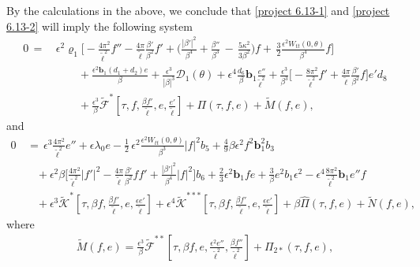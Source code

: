 \documentclass[10pt, reqno]{amsart}
\numberwithin{equation}{section}
\theoremstyle{definition}
\begin{document}
{By the calculations in the above, we conclude that \eqref{project 6.13-1} and \eqref{project 6.13-2} will imply the following system
\begin{align*}
0\,=\,&
 \epsilon^2\varrho_1\Bigg[- \frac{4\pi^2}{{\tilde\ell}^2}{f}'' - \frac{4\pi}{\tilde\ell} \frac{\beta'}{\beta^2} f'
+ \Big(\frac{|\beta'|^2}{\beta^4}
+\frac{\beta''} {\beta^3}
\,-\,\frac{5\kappa^2}{3\beta^2} \Big) f
+ \, \frac 32\frac{\epsilon^2W_{tt}(0, \theta)}{\beta^4} f \Bigg]
\nonumber\\[2mm]
&\qquad + \frac {\epsilon^2 {\mathbf b}_1(d_1+d_2)e}\beta
+\frac{\epsilon^3}{|\beta|^3}{\mathcal D}_1(\theta)
+ \epsilon^4 \frac{d_6} {\beta}{\mathbf b}_1 \frac{e''}{\tilde\ell^2}
+ \frac{\epsilon^3}{\beta^3}\Big[ -\frac{8\pi^2}{{\tilde\ell}^2}f' +\frac{4\pi}{ {\tilde\ell}}\frac{\beta'}{\beta^2} f\Big]e'd_8
\nonumber\\[2mm]
&\qquad
+\frac{\epsilon^3}{\beta}\tilde{\mathcal F}^{*} \left[\tau, f, \frac{\beta {f}'}{\tilde\ell}, e, \frac{e'}{\tilde\ell}\right]+ \Pi(\tau, f, e) + \tilde M(f, e),
\end{align*}
and
\begin{align*}
 0&\,=\,\epsilon^3\frac{4\pi^2}{{\tilde\ell}^2} e'' + \epsilon\lambda_0 e
 -\frac{1}{2}\, \epsilon^2 \frac{ \epsilon^2W_{tt}(0, \theta)}{\beta^3}|f|^2 b_5 +\frac{4}{9} \beta\epsilon^2 f^2 {\mathbf b}_1^2 b_3
\nonumber\\[2mm]
 & \quad
 + \epsilon^2\beta\Big[\frac{4\pi^2}{{\tilde\ell}^2}|f'|^2
-\frac{4\pi}{{\tilde\ell}}\frac{\beta'}{\beta^2}ff'
+\frac{|\beta'|^2}{\beta^4} |f|^2
\Big] b_6
 +\frac 23\epsilon^2 {\mathbf b}_1 fe + \frac3{\beta}e^2b_1 \epsilon^2 - \epsilon^4 \frac{8\pi^2} {{\tilde\ell}^2} {\mathbf b}_1 e'' f
\nonumber\\[2mm]
 & \quad
  + \epsilon^3 \tilde{\mathcal K}^* \left[\tau, \beta f, \frac{\beta {f}'}{\tilde\ell}, e, \frac{\epsilon e'}{\tilde\ell}\right] + \epsilon^4 \tilde{\mathcal K}^{***} \left[\tau, \beta f, \frac{\beta {f}'}{\tilde\ell}, e, \frac{\epsilon e'}{\tilde\ell}\right]
+ \beta \hat\Pi(\tau, f, e)+ \tilde N(f, e),
\end{align*}
 where
\begin{align*}
 \tilde M(f, e) = \frac{\epsilon^3}{\beta}\tilde{\mathcal F}^{**} \left[\tau, \beta f, e, \frac{\epsilon^2 e''}{\tilde\ell^2}, \frac{\beta f''}{\tilde\ell^2}\right] +\Pi_{2*}(\tau, f, e),
\end{align*}
\begin{align*}

\end{align*}}
\end{document}
